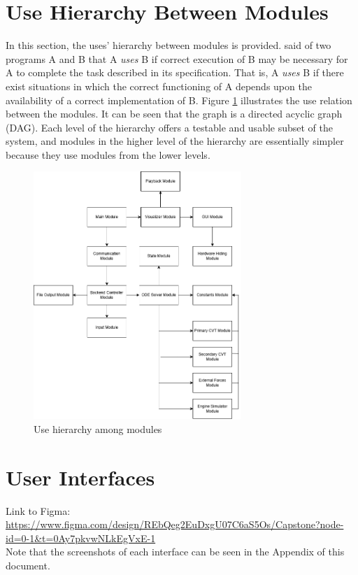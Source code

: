 \documentclass[12pt, titlepage]{article}
\begin{document}
\section{Use Hierarchy Between Modules} \label{SecUse}

In this section, the uses' hierarchy between modules is
provided. \citet{Parnas1978} said of two programs A and B that A {\em uses} B if
correct execution of B may be necessary for A to complete the task described in
its specification. That is, A {\em uses} B if there exist situations in which
the correct functioning of A depends upon the availability of a correct
implementation of B.  Figure \ref{FigUH} illustrates the use relation between
the modules. It can be seen that the graph is a directed acyclic graph
(DAG). Each level of the hierarchy offers a testable and usable subset of the
system, and modules in the higher level of the hierarchy are essentially simpler
because they use modules from the lower levels.

\begin{figure}[H]
\centering
\includegraphics[width=0.7\textwidth]{moduleDrawing.drawio.png}
\caption{Use hierarchy among modules}
\label{FigUH}
\end{figure}


\section{User Interfaces}
\noindent Link to Figma:
\url{https://www.figma.com/design/REbQeg2EuDxgU07C6aS5Os/Capstone?node-id=0-1&t=0Ay7pkvwNLkEgVxE-1}
\\
\noindent Note that the screenshots of each interface can be seen in the Appendix of this document.
\end{document}
